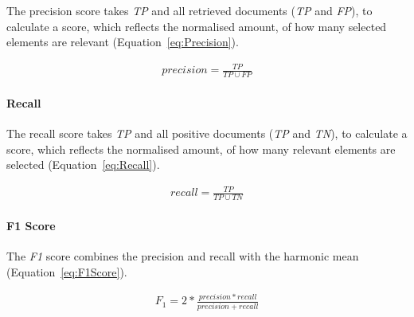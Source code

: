 The precision score takes \textit{TP} and all retrieved documents (\textit{TP} and \textit{FP}), to calculate a score, which reflects the normalised amount, of how many selected elements are relevant (Equation~\ref{eq:Precision}).

\begin{equation} \label{eq:Precision}
\begin{gathered}
precision = \frac{TP}{TP \cup  FP}
\end{gathered}
\end{equation}

\paragraph{Recall}
\label{sub:recall}

The recall score takes \textit{TP} and all positive documents (\textit{TP} and \textit{TN}), to calculate a score, which reflects the normalised amount, of how many relevant elements are selected (Equation~\ref{eq:Recall}).

\begin{equation} \label{eq:Recall}
\begin{gathered}
recall = \frac{TP}{TP \cup  TN}
\end{gathered}
\end{equation}

\paragraph{F1 Score}
\label{sub:F1Score}
The \textit{F1} score combines the precision and recall with the harmonic mean (Equation~\ref{eq:F1Score}).

\begin{equation} \label{eq:F1Score}
\begin{gathered}
F_{1} = 2 * \frac{precision * recall}{precision + recall}
\end{gathered}
\end{equation}

